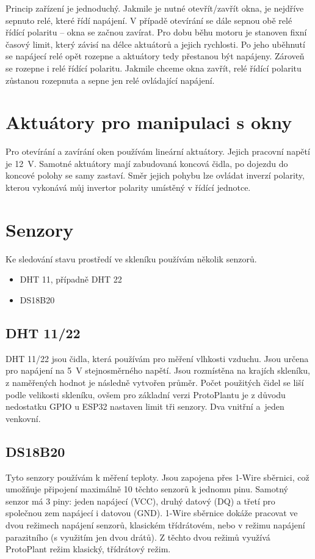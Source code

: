 Princip zařízení je jednoduchý.
Jakmile je nutné otevřít/zavřít okna, je nejdříve sepnuto relé, které řídí napájení.
V případě otevírání se dále sepnou obě relé řídící polaritu -- okna se začnou zavírat.
Pro dobu běhu motoru je stanoven fixní časový limit, který závisí na délce aktuátorů a jejich rychlosti. Po jeho uběhnutí se napájecí relé opět rozepne a aktuátory tedy přestanou být napájeny.
Zároveň se rozepne i relé řídící polaritu.
Jakmile chceme okna zavřít, relé řídící polaritu zůstanou rozepnuta a sepne jen relé ovládající napájení.



\section{Aktuátory pro manipulaci s okny}
Pro otevírání a zavírání oken používám lineární aktuátory.
Jejich pracovní napětí je 12~V.
Samotné aktuátory mají zabudovaná koncová čidla, po dojezdu do koncové polohy se samy zastaví.
Směr jejich pohybu lze ovládat inverzí polarity, kterou vykonává můj invertor polarity umístěný v řídící jednotce.

\section{Senzory}
Ke sledování stavu prostředí ve skleníku používám několik senzorů.
\begin{itemize}
	\item DHT 11, případně DHT 22
	\item DS18B20
\end{itemize}

\subsection{DHT 11/22}
DHT 11/22 jsou čidla, která používám pro měření vlhkosti vzduchu.
Jsou určena pro napájení na 5~V stejnosměrného napětí.
Jsou rozmístěna na krajích skleníku, z naměřených hodnot je následně vytvořen průměr. 
Počet použitých čidel se liší podle velikosti skleníku, ovšem pro základní verzi ProtoPlantu je z důvodu nedostatku GPIO u ESP32 nastaven limit tři senzory. Dva vnitřní a~jeden venkovní.

\subsection{DS18B20}
Tyto senzory používám k měření teploty.
Jsou zapojena přes 1-Wire sběrnici, což umožňuje připojení maximálně 10 těchto senzorů k jednomu pinu.
Samotný senzor má 3 piny: jeden napájecí (VCC), druhý datový (DQ) a třetí pro společnou zem napájecí i datovou (GND).
1-Wire sběrnice dokáže pracovat ve dvou režimech napájení senzorů, klasickém třídrátovém, nebo v režimu napájení parazitního (s využitím jen dvou drátů).
Z těchto dvou režimů využívá ProtoPlant režim klasický, třídrátový režim.

